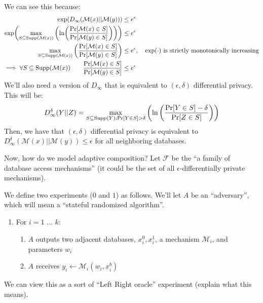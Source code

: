 \documentclass{article}
\theoremstyle{definition}
\begin{document}
We can see this because:
\begin{align*}
\exp(D_\infty(\mathcal{M}(x)||\mathcal{M}(y))) &\leq e^\epsilon \\
\exp(\max_{S\subseteq\text{Supp}(\mathcal{M}(x))}\pqty{\ln(\frac{\Pr[\mathcal{M}(x)\in S]}{\Pr[\mathcal{M}(y)\in S]})})&\leq e^\epsilon \\
\max_{S\subseteq\text{Supp}(\mathcal{M}(x))}\pqty{\frac{\Pr[\mathcal{M}(x)\in S]}{\Pr[\mathcal{M}(y)\in S]}}&\leq e^\epsilon,\quad \exp(\cdot)\text{ is strictly monotonically increasing} \\
\implies \forall S\subseteq\text{Supp}(\mathcal{M}(x))\qquad \frac{\Pr[\mathcal{M}(x)\in S]}{\Pr[\mathcal{M}(y)\in S]} &\leq e^\epsilon
\end{align*}
We'll also need a version of $D_\infty$ that is equivalent to $(\epsilon,\delta)$ differential privacy.
This will be:
\begin{equation}
D_\infty^\delta (Y||Z) = \max_{S\subseteq\text{Supp}(Y):\Pr[Y\in S] > \delta}\pqty{\ln\pqty{\frac{\Pr[Y\in S] - \delta}{\Pr[Z\in S]}}}
\end{equation}
Then, we have that $(\epsilon,\delta)$ differential privacy is equivalent to $D^\delta_\infty (\mathcal{M}(x)||\mathcal{M}(y)) \leq \epsilon$ for all neighboring databases.


Now, how do we model adaptive composition?
Let $\mathcal{F}$ be the ``a family of database access mechanisms'' (it could be the set of all $\epsilon$-differentially private mechanisms).

We define two experiments ($0$ and $1$) as follows.
We'll let $A$ be an ``adversary'', which will mean a ``stateful randomized algorithm''.

\begin{enumerate}
\item For $i = 1$ ... $k$:
\begin{enumerate}
\item $A$ outputs two adjacent databases, $x_i^0, x_i^1$, a mechanism $\mathcal{M}_i$, and parameters $w_i$
\item $A$ receives $y_i\leftarrow\mathcal{M}_i(w_i,x_i^b)$
\end{enumerate}
\end{enumerate}
We can view this as a sort of ``Left Right oracle'' experiment (explain what this means).
\end{document}
